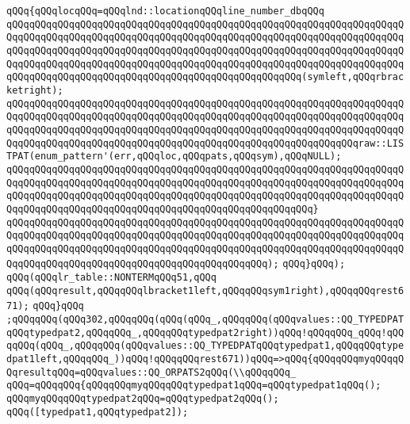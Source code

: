 \verb|qQQq{qQQqlocqQQq=qQQqlnd::locationqQQqline_number_dbqQQq|\newline
\verb|qQQqqQQqqQQqqQQqqQQqqQQqqQQqqQQqqQQqqQQqqQQqqQQqqQQqqQQqqQQqqQQqqQQqqQQqqQQqqQQqqQQqqQQqqQQqqQQqqQQqqQQqqQQqqQQqqQQqqQQqqQQqqQQqqQQqqQQqqQQqqQQqqQQqqQQqqQQqqQQqqQQqqQQqqQQqqQQqqQQqqQQqqQQqqQQqqQQqqQQqqQQqqQQqqQQqqQQqqQQqqQQqqQQqqQQqqQQqqQQqqQQqqQQqqQQqqQQqqQQqqQQqqQQqqQQqqQQqqQQqqQQqqQQqqQQqqQQqqQQqqQQqqQQqqQQqqQQqqQQqqQQqqQQqqQQq(symleft,qQQqrbracketright);|\newline
\verb|qQQqqQQqqQQqqQQqqQQqqQQqqQQqqQQqqQQqqQQqqQQqqQQqqQQqqQQqqQQqqQQqqQQqqQQqqQQqqQQqqQQqqQQqqQQqqQQqqQQqqQQqqQQqqQQqqQQqqQQqqQQqqQQqqQQqqQQqqQQqqQQqqQQqqQQqqQQqqQQqqQQqqQQqqQQqqQQqqQQqqQQqqQQqqQQqqQQqqQQqqQQqqQQqqQQqqQQqqQQqqQQqqQQqqQQqqQQqqQQqqQQqqQQqqQQqqQQqqQQqqQQqqQQqqQQqraw::LISTPAT(enum_pattern'(err,qQQqloc,qQQqpats,qQQqsym),qQQqNULL);|\newline
\verb|qQQqqQQqqQQqqQQqqQQqqQQqqQQqqQQqqQQqqQQqqQQqqQQqqQQqqQQqqQQqqQQqqQQqqQQqqQQqqQQqqQQqqQQqqQQqqQQqqQQqqQQqqQQqqQQqqQQqqQQqqQQqqQQqqQQqqQQqqQQqqQQqqQQqqQQqqQQqqQQqqQQqqQQqqQQqqQQqqQQqqQQqqQQqqQQqqQQqqQQqqQQqqQQqqQQqqQQqqQQqqQQqqQQqqQQqqQQqqQQqqQQqqQQqqQQqqQQqqQQqqQQq}|\newline
\verb|qQQqqQQqqQQqqQQqqQQqqQQqqQQqqQQqqQQqqQQqqQQqqQQqqQQqqQQqqQQqqQQqqQQqqQQqqQQqqQQqqQQqqQQqqQQqqQQqqQQqqQQqqQQqqQQqqQQqqQQqqQQqqQQqqQQqqQQqqQQqqQQqqQQqqQQqqQQqqQQqqQQqqQQqqQQqqQQqqQQqqQQqqQQqqQQqqQQqqQQqqQQqqQQqqQQqqQQqqQQqqQQqqQQqqQQqqQQqqQQqqQQqqQQqqQQqqQQq);|\newline
\verb|qQQq}qQQq);|\newline
\verb|qQQq(qQQqlr_table::NONTERMqQQq51,qQQq|\newline
\verb|qQQq(qQQqresult,qQQqqQQqlbracket1left,qQQqqQQqsym1right),qQQqqQQqrest671);|\newline
\verb|qQQq}qQQq|\newline
\verb|;qQQqqQQq(qQQq302,qQQqqQQq(qQQq(qQQq_,qQQqqQQq(qQQqvalues::QQ_TYPEDPATqQQqtypedpat2,qQQqqQQq_,qQQqqQQqtypedpat2right))qQQq!qQQqqQQq_qQQq!qQQqqQQq(qQQq_,qQQqqQQq(qQQqvalues::QQ_TYPEDPATqQQqtypedpat1,qQQqqQQqtypedpat1left,qQQqqQQq_))qQQq!qQQqqQQqrest671))qQQq=>qQQq{qQQqqQQqmyqQQqqQQqresultqQQq=qQQqvalues::QQ_ORPATS2qQQq(\\qQQqqQQq_|\newline
\verb|qQQq=qQQqqQQq{qQQqqQQqmyqQQqqQQqtypedpat1qQQq=qQQqtypedpat1qQQq();|\newline
\verb|qQQqmyqQQqqQQqtypedpat2qQQq=qQQqtypedpat2qQQq();|\newline
\verb|qQQq([typedpat1,qQQqtypedpat2]);|\newline
